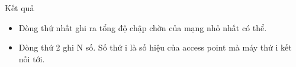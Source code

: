 Kết quả
\begin{itemize}
	\item Dòng thứ nhất ghi ra tổng độ chập chờn của mạng nhỏ nhất có thể.
	\item Dòng thứ 2 ghi N số. Số thứ i là số hiệu của access point mà máy thứ i kết nối tới.
\end{itemize}